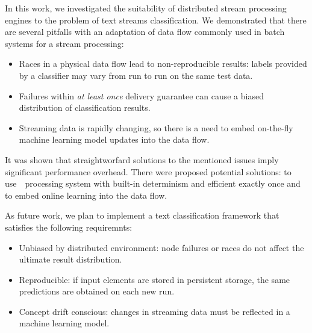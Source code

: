 \label {fs-conclusion}

In this work, we investigated the suitability of distributed stream processing engines to the problem of text streams classification. We demonstrated that there are several pitfalls with an adaptation of data flow commonly used in batch systems for a stream processing:

\begin{itemize}
    \item Races in a physical data flow lead to non-reproducible results: labels provided by a classifier may vary from run to run on the same test data. 
    \item Failures within {\em at least once} delivery guarantee can cause a biased distribution of classification results.
    \item Streaming data is rapidly changing, so there is a need to embed on-the-fly machine learning model updates into the data flow. 
\end{itemize}

It was shown that straightworfard solutions to the mentioned issues imply significant performance overhead. There were proposed potential solutions: to use~\FlameStream\ processing system with built-in determinism and efficient exactly once and to embed online learning into the data flow. 

As future work, we plan to implement a text classification framework that satisfies the following requiremnts:

\begin{itemize}
    \item Unbiased by distributed environment: node failures or races do not affect the ultimate result distribution.
    \item Reproducible: if input elements are stored in persistent storage, the same predictions are obtained on each new run.
    \item Concept drift conscious: changes in streaming data must be reflected in a machine learning model.  
\end{itemize}